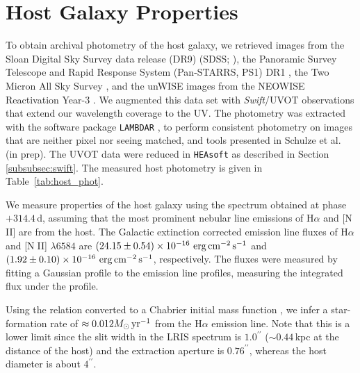 \documentclass[twocolumn]{aastex63}
\def\ion#1#2{#1$\;${\footnotesize\rm{#2}}\relax}
\newcommand{\swift}{\textit{Swift}}
\begin{document}
\section{Host Galaxy Properties} \label{sec:host}


To obtain archival photometry of the host galaxy, we retrieved images from the Sloan 
Digital Sky Survey data release (DR9) (SDSS; \citealt{Ahn2012a}), the Panoramic Survey Telescope and 
Rapid Response System (Pan-STARRS, PS1) 
DR1 \citep{Flewelling2016}, the Two Micron All Sky Survey \citep[2MASS;][]{Skrutskie2006a}, and the 
unWISE images \citep{Lang2014a} from the NEOWISE Reactivation Year-3 \citep{Meisner2017a}. We 
augmented this data set with \swift/UVOT observations that extend our wavelength coverage to 
the UV. The photometry was extracted with the software package \texttt{LAMBDAR} \citep[Lambda 
Adaptive Multi-Band Deblending Algorithm in R;][]{Wright2016a}, to perform consistent photometry on 
images that are neither pixel nor seeing matched, and tools presented in Schulze et al. (in prep). The 
UVOT data were reduced in \texttt{HEAsoft} as described in Section \ref{subsubsec:swift}. The 
measured host photometry is given in Table~\ref{tab:host_phot}.

We measure properties of the host galaxy using the spectrum obtained at phase $+314.4$\,d, 
assuming that the most prominent nebular line emissions of H$\alpha$ and [\ion{N}{II}] 
are from the host. The Galactic extinction corrected emission line fluxes of H$\alpha$ and [\ion{N}{II}] 
$\lambda6584$ are $(24.15 \pm 0.54) \times 10^{-16}~{\rm erg\,cm}^{-2}\,{\rm s}^{-1}$ and $(1.92 \pm 
0.10 ) \times 10^{-16}~{\rm erg\,cm}^{-2}\,{\rm s}^{-1}$, respectively. The fluxes were 
measured by fitting a Gaussian profile to the emission line profiles, 
measuring the integrated flux under the profile.

Using the \citet{Kennicutt1998} relation converted to a Chabrier initial mass function 
\citep{Chabrier2003, Madau2014}, we infer a star-formation rate of $\approx 0.012 M_\odot\, {\rm 
	yr^{-1}}$ from the H$\alpha$ emission line. Note that this is a lower limit since the slit width in the 
LRIS spectrum is $1.0^{\prime\prime}$ ($\sim 0.44$\,kpc at the distance of the host) and the 
extraction aperture 
is $0.76^{\prime\prime}$, whereas the host diameter is about $4^{\prime\prime}$.
\end{document}
